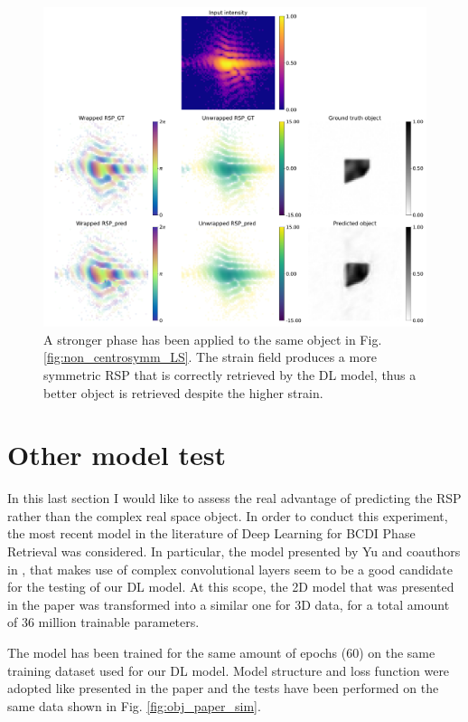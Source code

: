 \begin{figure}[H]
    \centering
    \includegraphics[width=\textwidth]{figures/Phasing/non_centrosymmetric_study_3d_random_HS0.pdf}
    \caption{A stronger phase has been applied to the same object in Fig. \ref{fig:non_centrosymm_LS}. The strain field 
    produces a more symmetric RSP that is correctly retrieved by the DL model, thus a better object is retrieved despite the 
    higher strain. }
    \label{fig:non_centrosymm_HS}
\end{figure}

\section{Other model test}\label{sec:other_model}

In this last section I would like to assess the real advantage of predicting the RSP rather than the complex real space object. 
In order to conduct this experiment, the most recent model in the literature of Deep Learning for BCDI Phase Retrieval was 
considered. In particular, the model presented by Yu and coauthors in \cite{yu_ultrafast_2024}, that makes use of complex 
convolutional layers seem to be a good candidate for the testing of our DL model.
At this scope, the 2D model that was presented in the paper was transformed into a similar one for 3D data, for a total 
amount of 36 million trainable parameters. 

The model has been trained for the same amount of epochs (60) on the same training dataset used for our DL model. Model structure 
and loss function were adopted like presented in the paper and the tests have been performed on the same data shown in Fig. \ref{fig:obj_paper_sim}. 

